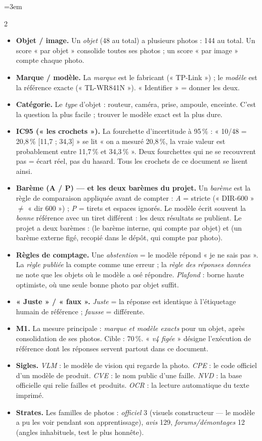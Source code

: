 \documentclass[10pt,a4paper]{article}
\providecommand{\NoAutoSpacing}{}
\newcommand{\code}[1]{{\NoAutoSpacing\ttfamily\detokenize{#1}}}
\begin{document}
{\footnotesize\sffamily\emergencystretch=3em
\begin{multicols}{2}
\begin{itemize}
\item \textbf{Objet / image.} Un \emph{objet} (48 au total) a plusieurs photos : 144 au total.
Un score « par objet » consolide toutes ses photos ; un score « par image » compte chaque photo.
\item \textbf{Marque / modèle.} La \emph{marque} est le fabricant (« TP-Link ») ; le \emph{modèle}
est la référence exacte (« TL-WR841N »). « Identifier » = donner les deux.
\item \textbf{Catégorie.} Le \emph{type} d'objet : routeur, caméra, prise, ampoule, enceinte.
C'est la question la plus facile ; trouver le modèle exact est la plus dure.
\item \textbf{IC95 (« les crochets »).} La fourchette d'incertitude à 95\,\% : « 10/48 =
20,8\,\% [11,7 ; 34,3] » se lit « on a mesuré 20,8\,\%, la vraie valeur est probablement entre
11,7\,\% et 34,3\,\% ». Deux fourchettes qui ne se recouvrent pas = écart réel, pas du hasard.
Tous les crochets de ce document se lisent ainsi.
\item \textbf{Barème (A / P) — et les deux barèmes du projet.} Un \emph{barème} est la règle de
comparaison appliquée avant de compter : \emph{A} = stricte (« DIR-600 » $\neq$ « dir 600 ») ;
\emph{P} = tirets et espaces ignorés. Le modèle écrit souvent la \emph{bonne} référence avec un
tiret différent : les deux résultats se publient. Le projet a deux barèmes : \code{metrics} (le
barème interne, qui compte par objet) et \code{audit-grading} (un barème externe figé, recopié
dans le dépôt, qui compte par photo).
\item \textbf{Règles de comptage.} Une \emph{abstention} = le modèle répond « je ne sais pas ».
La \emph{règle publiée} la compte comme une erreur ; la \emph{règle des réponses données} ne note
que les objets où le modèle a osé répondre. \emph{Plafond} : borne haute optimiste, où une seule
bonne photo par objet suffit.
\item \textbf{« Juste » / « faux ».} \emph{Juste} = la réponse est identique à l'étiquetage humain
de référence ; \emph{fausse} = différente.
\item \textbf{M1.} La mesure principale : \emph{marque et modèle exacts} pour un objet, après
consolidation de ses photos. Cible : 70\,\%. « \emph{v4 figée} » désigne l'exécution de référence
dont les réponses servent partout dans ce document.
\item \textbf{Sigles.} \emph{VLM} : le modèle de vision qui regarde la photo. \emph{CPE} : le code
officiel d'un modèle de produit. \emph{CVE} : le nom public d'une faille. \emph{NVD} : la base
officielle qui relie failles et produits. \emph{OCR} : la lecture automatique du texte imprimé.
\item \textbf{Strates.} Les familles de photos : \emph{officiel} 3 (visuels constructeur — le
modèle a pu les voir pendant son apprentissage), \emph{avis} 129, \emph{forums/démontages} 12
(angles inhabituels, test le plus honnête).


\end{itemize}
\end{multicols}}
\end{document}
